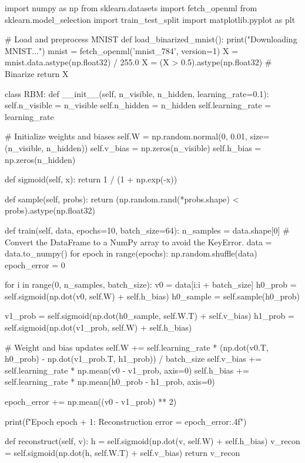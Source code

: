 \documentclass[%
oneside,                 %
final,                   %
10pt]{article}
\begin{document}
\bpycod
import numpy as np
from sklearn.datasets import fetch_openml
from sklearn.model_selection import train_test_split
import matplotlib.pyplot as plt

# Load and preprocess MNIST
def load_binarized_mnist():
    print("Downloading MNIST...")
    mnist = fetch_openml('mnist_784', version=1)
    X = mnist.data.astype(np.float32) / 255.0
    X = (X > 0.5).astype(np.float32)  # Binarize
    return X

class RBM:
    def __init__(self, n_visible, n_hidden, learning_rate=0.1):
        self.n_visible = n_visible
        self.n_hidden = n_hidden
        self.learning_rate = learning_rate

        # Initialize weights and biases
        self.W = np.random.normal(0, 0.01, size=(n_visible, n_hidden))
        self.v_bias = np.zeros(n_visible)
        self.h_bias = np.zeros(n_hidden)

    def sigmoid(self, x):
        return 1 / (1 + np.exp(-x))

    def sample(self, probs):
        return (np.random.rand(*probs.shape) < probs).astype(np.float32)

    def train(self, data, epochs=10, batch_size=64):
        n_samples = data.shape[0]
        # Convert the DataFrame to a NumPy array to avoid the KeyError.
        data = data.to_numpy()  
        for epoch in range(epochs):
            np.random.shuffle(data)
            epoch_error = 0

            for i in range(0, n_samples, batch_size):
                v0 = data[i:i + batch_size]
                h0_prob = self.sigmoid(np.dot(v0, self.W) + self.h_bias)
                h0_sample = self.sample(h0_prob)

                v1_prob = self.sigmoid(np.dot(h0_sample, self.W.T) + self.v_bias)
                h1_prob = self.sigmoid(np.dot(v1_prob, self.W) + self.h_bias)

                # Weight and bias updates
                self.W += self.learning_rate * (np.dot(v0.T, h0_prob) - np.dot(v1_prob.T, h1_prob)) / batch_size
                self.v_bias += self.learning_rate * np.mean(v0 - v1_prob, axis=0)
                self.h_bias += self.learning_rate * np.mean(h0_prob - h1_prob, axis=0)

                epoch_error += np.mean((v0 - v1_prob) ** 2)

            print(f"Epoch {epoch + 1}: Reconstruction error = {epoch_error:.4f}")

    def reconstruct(self, v):
        h = self.sigmoid(np.dot(v, self.W) + self.h_bias)
        v_recon = self.sigmoid(np.dot(h, self.W.T) + self.v_bias)
        return v_recon
\end{document}
